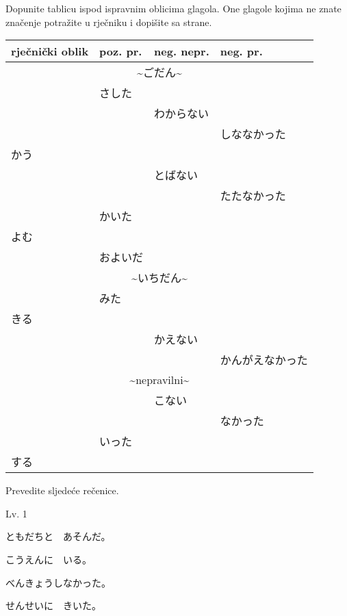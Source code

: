
\author{Tomislav Mamić}

	
	Dopunite tablicu ispod ispravnim oblicima glagola. One glagole kojima ne znate značenje potražite u rječniku i dopišite sa strane.
	
	\vspace{5pt}
	\begin{tabular}{|l|l|l|l|}
		\hline
		rječnički oblik & poz. pr. & neg. nepr. & neg. pr.\\
		\hline
		\multicolumn{4}{|c|}{\textasciitilde ごだん\textasciitilde}\\
		\hline
		&さした&&\\
		&&わからない&\\
		&&&しななかった\\
		かう&&&\\
		&&とばない&\\
		&&&たたなかった\\
		&かいた&&\\
		よむ&&&\\
		&およいだ&&\\
		\hline
		\multicolumn{4}{|c|}{\textasciitilde いちだん\textasciitilde}\\
		\hline
		&みた&&\\
		きる&&&\\
		&&かえない&\\
		&&&かんがえなかった\\
		\hline
		\multicolumn{4}{|c|}{\textasciitilde nepravilni\textasciitilde}\\
		\hline
		&&こない&\\
		&&&なかった\\
		&いった&&\\
		する&&&\\
		\hline
	\end{tabular}

	\newpage
	Prevedite sljedeće rečenice.
	
	\begin{mondai}{Lv. 1}
		\item ともだちと　あそんだ。
		\item こうえんに　いる。
		\item べんきょうしなかった。
		\item せんせいに　きいた。
	\end{mondai}

